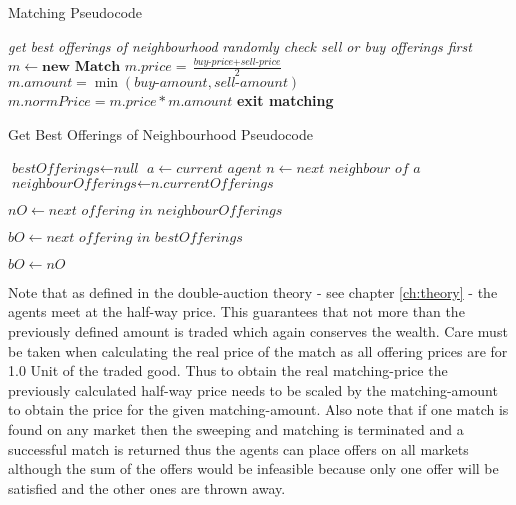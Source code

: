 \documentclass[Bachelorarbeit.tex]{subfiles}
\begin{document}
\begin{algorithm}
\caption{Matching Pseudocode}\label{euclid}
\begin{algorithmic}[1]
\State \textit{get best offerings of neighbourhood}
	\State \textit{randomly check sell or buy offerings first}
		\State $m \gets \textbf{new Match}$
		\State $m.price = \frac{\textit{buy-price} + \textit{sell-price}}{2}$
		\State $m.amount = \min(\textit{buy-amount}, \textit{sell-amount})$
		\State $m.normPrice = m.price * m.amount$
		\State \textbf{exit matching}
	\EndIf
\EndFor
\end{algorithmic}
\end{algorithm}

\begin{algorithm}
\caption{Get Best Offerings of Neighbourhood Pseudocode}\label{euclid}
\begin{algorithmic}[1]
\State $\textit{bestOfferings} \gets \textit{null}$
\State $a \gets \textit{current agent}$
	\State $n \gets \textit{next neighbour of a}$
	\State $\textit{neighbourOfferings} \gets \textit{n.currentOfferings}$
	
		\State $nO \gets \textit{next offering in neighbourOfferings}$
		
			\State $bO \gets \textit{next offering in bestOfferings}$
		
				\State $bO \gets nO$
			\EndIf
		\EndFor
	\EndFor
\EndFor
\end{algorithmic}
\end{algorithm}

Note that as defined in the double-auction theory - see chapter \ref{ch:theory} - the agents meet at the half-way price. This guarantees that not more than the previously defined amount is traded which again conserves the wealth. Care must be taken when calculating the real price of the match as all offering prices are for 1.0 Unit of the traded good. Thus to obtain the real matching-price the previously calculated half-way price needs to be scaled by the matching-amount to obtain the price for the given matching-amount.
\medskip
Also note that if one match is found on any market then the sweeping and matching is terminated and a successful match is returned thus the agents can place offers on all markets although the sum of the offers would be infeasible because only one offer will be satisfied and the other ones are thrown away.
\end{document}
